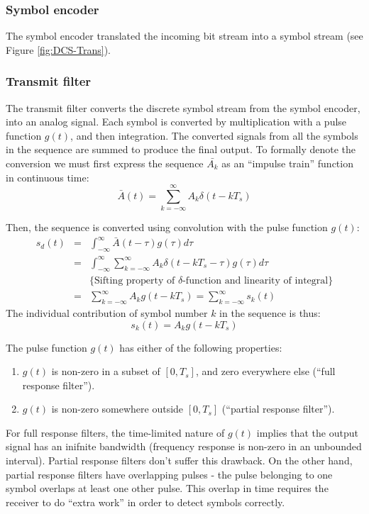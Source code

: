 \documentclass[onecolumn,x11names,technote,twoside,a4paper,12pt,english]{IEEEtran}
\begin{document}
\subsubsection{Symbol encoder}
\label{sec:sym-enc}
The symbol encoder translated the incoming bit stream into a symbol stream (see Figure \ref{fig:DCS-Trans}).

\subsubsection{Transmit filter}
\label{sec:bb-tf}
The transmit filter converts the discrete symbol stream from the symbol encoder, into an analog signal. Each symbol is converted by multiplication with a pulse function $g(t)$, and then integration. The converted signals from all the symbols in the sequence are summed to produce the final output. To formally denote the conversion we must first express the sequence $\bar{A_k}$ as an ``impulse train'' function in continuous time: 
\begin{equation*}
  \bar{A}(t) = \sum_{k=-\infty}^{\infty}{A_k \delta(t - kT_s)}
\end{equation*}

Then, the sequence is converted using convolution with the pulse function $g(t)$:
\begin{eqnarray*}
  s_d(t) &=& \int_{-\infty}^{\infty}{\bar{A}(t-\tau) g(\tau) d\tau} \\
         &=& \int_{-\infty}^{\infty}{\sum_{k=-\infty}^{\infty}{A_k \delta(t - kT_s - \tau) } g(\tau) d\tau}  \\
         && \mbox{\{Sifting property of $\delta$-function and linearity of integral\}} \\
         &=& \sum_{k=-\infty}^{\infty}{A_k g(t - k T_s)} = \sum_{k=-\infty}^{\infty}{s_k(t)}
\end{eqnarray*}
The individual contribution of symbol number $k$ in the sequence is thus:
\begin{equation*}
  s_k(t) = A_k g(t - k T_s)
\end{equation*}

The pulse function $g(t)$ has either of the following properties:
\begin{enumerate}
\item $g(t)$ is non-zero in a subset of $[0,T_s]$, and zero everywhere else (``full response filter'').
\item $g(t)$ is non-zero somewhere outside $[0,T_s]$ (``partial response filter'').
\end{enumerate}
For full response filters, the time-limited nature of $g(t)$ implies that the output signal has an inifnite bandwidth (frequency response is non-zero in an unbounded interval). Partial response filters don't suffer this drawback. On the other hand, partial response filters have overlapping pulses - the pulse belonging to one symbol overlaps at least one other pulse. This overlap in time requires the receiver to do ``extra work'' in order to detect symbols correctly.
\end{document}
